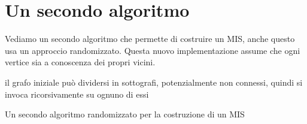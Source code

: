 \documentclass{article}
\begin{document}
\section{Un secondo algoritmo}
Vediamo un secondo algoritmo che permette di costruire un MIS, anche questo
usa un approccio randomizzato. Questa nuovo implementazione assume che ogni
vertice sia a conoscenza dei propri vicini.
\begin{algorithm}
 \SetAlgoLined
    il grafo iniziale pu\`o dividersi in sottografi, potenzialmente
    non connessi, quindi si invoca ricorsivamente su ognuno di essi
 \caption{Un secondo algoritmo randomizzato per la costruzione di un MIS}
\end{algorithm}


\end{document}
